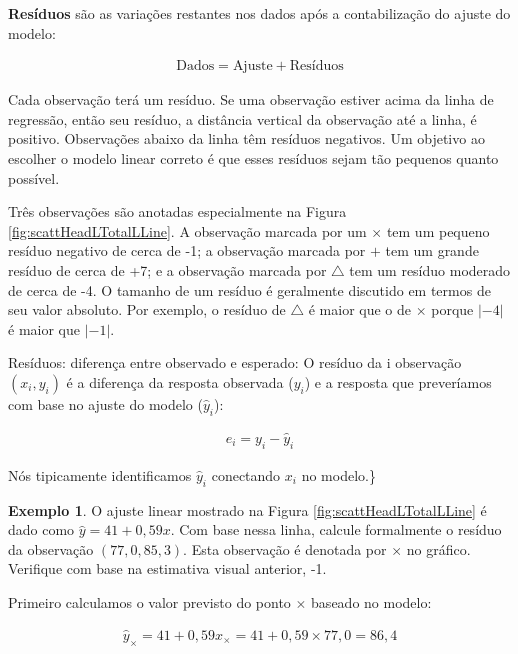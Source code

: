 \documentclass[
]{book}
\theoremstyle{definition}
\theoremstyle{definition}
\newtheorem{example}{Exemplo}[chapter]
\theoremstyle{definition}
\theoremstyle{definition}
\theoremstyle{remark}
\begin{document}

\textbf{Resíduos} são as variações restantes nos dados após a contabilização do ajuste do modelo:

\begin{align*}
\text{Dados} = \text{Ajuste} + \text{Resíduos}
\end{align*}

Cada observação terá um resíduo. Se uma observação estiver acima da linha de regressão, então seu resíduo, a distância vertical da observação até a linha, é positivo. Observações abaixo da linha têm resíduos negativos. Um objetivo ao escolher o modelo linear correto é que esses resíduos sejam tão pequenos quanto possível.

Três observações são anotadas especialmente na Figura \ref{fig:scattHeadLTotalLLine}. A observação marcada por um \(\times\) tem um pequeno resíduo negativo de cerca de -1; a observação marcada por \(+\) tem um grande resíduo de cerca de +7; e a observação marcada por \(\triangle\) tem um resíduo moderado de cerca de -4. O tamanho de um resíduo é geralmente discutido em termos de seu valor absoluto. Por exemplo, o resíduo de \(\triangle\) é maior que o de \(\times\) porque \(|-4|\) é maior que \(|-1|\).

Resíduos: diferença entre observado e esperado: O resíduo da i observação \((x_i, y_i)\) é a diferença da resposta observada (\(y_i\)) e a resposta que preveríamos com base no ajuste do modelo (\(\hat{y} _i\)):

\begin{eqnarray*}
e_i = y_i - \hat{y}_i
\end{eqnarray*}

Nós tipicamente identificamos \(\hat{y}_i\) conectando \(x_i\) no modelo.\}

\begin{example}
\protect\hypertarget{exm:unnamed-chunk-267}{}{\label{exm:unnamed-chunk-267} }O ajuste linear mostrado na Figura \ref{fig:scattHeadLTotalLLine} é dado como \(\hat{y} = 41 + 0,59x\). Com base nessa linha, calcule formalmente o resíduo da observação \((77,0, 85,3)\). Esta observação é denotada por \(\times\) no gráfico. Verifique com base na estimativa visual anterior, -1.
\end{example}

Primeiro calculamos o valor previsto do ponto \(\times\) baseado no modelo:

\begin{eqnarray*}
\hat{y}_{\times} = 41+0,59x_{\times} = 41+0,59\times 77,0 = 86,4
\end{eqnarray*}
\end{document}
